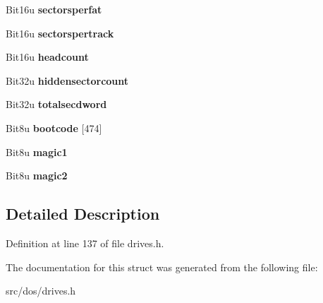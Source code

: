 \begin{DoxyCompactItemize}
\item 
\hypertarget{structbootstrap_a7abc121ee5cf0179d37f1cdb98391a41}{Bit16u {\bfseries sectorsperfat}}\label{structbootstrap_a7abc121ee5cf0179d37f1cdb98391a41}

\item 
\hypertarget{structbootstrap_a868404e778a74493156b30630a9b48e6}{Bit16u {\bfseries sectorspertrack}}\label{structbootstrap_a868404e778a74493156b30630a9b48e6}

\item 
\hypertarget{structbootstrap_a4f7f6491de73e87af208aab298c9136b}{Bit16u {\bfseries headcount}}\label{structbootstrap_a4f7f6491de73e87af208aab298c9136b}

\item 
\hypertarget{structbootstrap_abc6f5f20e1679a4f501abe1ef798b9f0}{Bit32u {\bfseries hiddensectorcount}}\label{structbootstrap_abc6f5f20e1679a4f501abe1ef798b9f0}

\item 
\hypertarget{structbootstrap_ad300f887cdb08ab96b6801d200917f06}{Bit32u {\bfseries totalsecdword}}\label{structbootstrap_ad300f887cdb08ab96b6801d200917f06}

\item 
\hypertarget{structbootstrap_a72cba09bab10bb5d38fd8f64eb1a7c75}{Bit8u {\bfseries bootcode} \mbox{[}474\mbox{]}}\label{structbootstrap_a72cba09bab10bb5d38fd8f64eb1a7c75}

\item 
\hypertarget{structbootstrap_a1811d90a55c9d108cc2c0d9d46193903}{Bit8u {\bfseries magic1}}\label{structbootstrap_a1811d90a55c9d108cc2c0d9d46193903}

\item 
\hypertarget{structbootstrap_abdbe4c43e70a69b62efde13144ef8241}{Bit8u {\bfseries magic2}}\label{structbootstrap_abdbe4c43e70a69b62efde13144ef8241}

\end{DoxyCompactItemize}


\subsection{Detailed Description}


Definition at line 137 of file drives.\-h.



The documentation for this struct was generated from the following file\-:\begin{DoxyCompactItemize}
\item 
src/dos/drives.\-h\end{DoxyCompactItemize}
